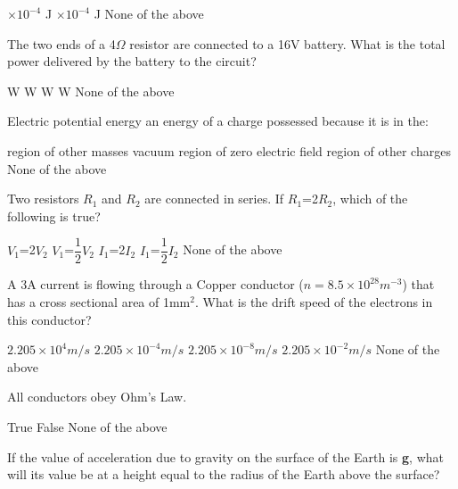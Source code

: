 \documentclass[12pt,addpoints]{exam}
\begin{document}
{{{\begin{questions}
\begin{oneparchoices}
						$\times10^{-4}$ J
						$\times10^{-4}$ J
						\choice None of the above
					\end{oneparchoices}
					\question The two ends of a 4$\Omega$ resistor are connected to a 16V battery. What is the total power delivered by the battery to the circuit?\\
					\begin{oneparchoices}
						 W 
						 W
						 W
						 W
						\choice None of the above
					\end{oneparchoices}
					\question Electric potential energy an energy of a charge possessed because it is in the:\\
					\begin{oneparchoices}
						\choice region of other masses
						\choice vacuum
						\choice region of zero electric field
						\choice region of other charges
						\choice None of the above
					\end{oneparchoices}
					\question Two resistors $R_1$ and $R_2$ are connected in series. If $R_1$=2$R_2$, which of the following is true?\\
					\begin{oneparchoices}
						\choice $V_1$=2$V_2$
						\choice $V_1$=$\dfrac{1}{2}$$V_2$
						\choice $I_1$=2$I_2$
						\choice $I_1$=$\dfrac{1}{2}$$I_2$
						\choice None of the above
					\end{oneparchoices}
					\question A 3A current is flowing through a Copper conductor ($n= 8.5\times10^{28}m^{-3}$) that has a cross sectional area of 1mm$^2$. What is the drift speed of the electrons in this conductor?\\
					\begin{oneparchoices}
						\choice $2.205\times10^{4}m/s$
						\choice $2.205\times10^{-4}m/s$
						\choice $2.205\times10^{-8}m/s$
						\choice $2.205\times10^{-2}m/s$
						\choice None of the above
					\end{oneparchoices}
					\question All conductors obey Ohm's Law.\\
					\begin{oneparchoices}
						\choice True
						\choice False
						\choice None of the above
					\end{oneparchoices}
					\question If the value of acceleration due to gravity on the surface of the Earth is \textbf{g}, what will its value be at a height equal to the radius of the Earth above the surface?\\ \\

\end{questions}}}}
\end{document}
